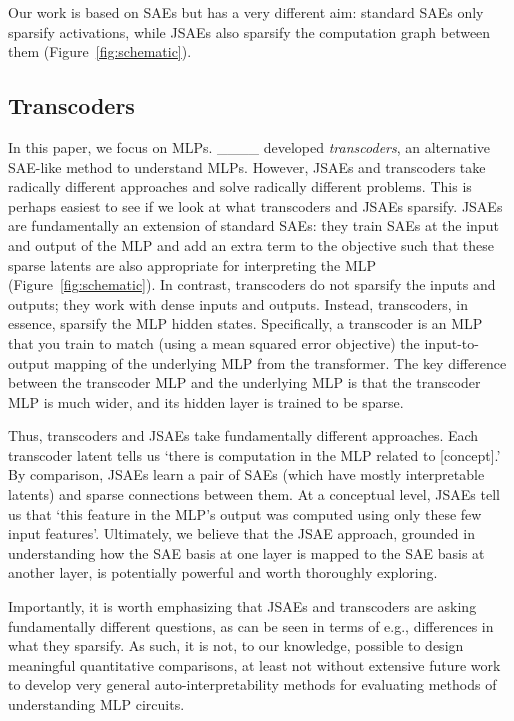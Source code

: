 Our work is based on SAEs but has a very different aim: standard SAEs only sparsify activations, while JSAEs also sparsify the computation graph between them (Figure~\ref{fig:schematic}).

\subsection{Transcoders}

In this paper, we focus on MLPs.
____ developed \emph{transcoders}, an alternative SAE-like method to understand MLPs. 
However, JSAEs and transcoders take radically different approaches and solve radically different problems.
This is perhaps easiest to see if we look at what transcoders and JSAEs sparsify.
JSAEs are fundamentally an extension of standard SAEs: they train SAEs at the input and output of the MLP and add an extra term to the objective such that these sparse latents are also appropriate for interpreting the MLP (Figure~\ref{fig:schematic}).
In contrast, transcoders do not sparsify the inputs and outputs; they work with dense inputs and outputs.
Instead, transcoders, in essence, sparsify the MLP hidden states.
Specifically, a transcoder is an MLP that you train to match (using a mean squared error objective) the input-to-output mapping of the underlying MLP from the transformer.
The key difference between the transcoder MLP and the underlying MLP is that the transcoder MLP is much wider, and its hidden layer is trained to be sparse.

Thus, transcoders and JSAEs take fundamentally different approaches.
Each transcoder latent tells us `there is computation in the MLP related to [concept].'
By comparison, JSAEs learn a pair of SAEs (which have mostly interpretable latents) and sparse connections between them.
At a conceptual level, JSAEs tell us that `this feature in the MLP's output was computed using only these few input features'.
Ultimately, we believe that the JSAE approach, grounded in understanding how the SAE basis at one layer is mapped to the SAE basis at another layer, is potentially powerful and worth thoroughly exploring.

Importantly, it is worth emphasizing that JSAEs and transcoders are asking fundamentally different questions, as can be seen in terms of e.g., differences in what they sparsify.  
As such, it is not, to our knowledge, possible to design meaningful quantitative comparisons, at least not without extensive future work to develop very general auto-interpretability methods for evaluating methods of understanding MLP circuits.

